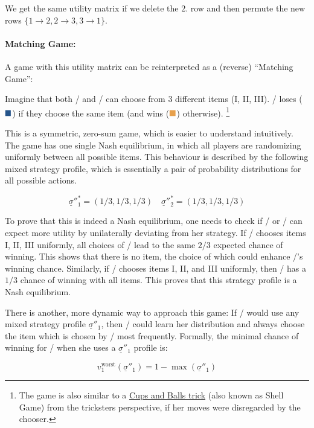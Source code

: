\documentclass{article}
\newcommand{\wbox}{\textcolor{w}{\blacksquare}}
\newcommand{\lbox}{\textcolor{l}{\blacksquare}}
\theoremstyle{definition}
\begin{document}
We get the same utility matrix if we delete the $2.$ row and then permute the new rows $\{1 \to 2, 2 \to 3, 3 \to 1 \}$.

\paragraph{Matching Game:}

A game with this utility matrix can be reinterpreted as a (reverse) ``Matching Game'':

Imagine that both \PI/ and \PII/ can choose from $3$ different items (I, II, III). \PI/ loses ($\lbox$) if they choose the same item (and wins ($\wbox$) otherwise). \footnote{The game is also similar to a \href{https://www.britannica.com/art/cups-and-balls-trick}{Cups and Balls trick} (also known as Shell Game) from the tricksters perspective, if her moves were disregarded by the chooser.}

This is a symmetric, zero-sum game, which is easier to understand intuitively.
The game has one single Nash equilibrium, in which all players are randomizing uniformly between all possible items. This behaviour is described by the following mixed strategy profile, which is essentially a pair of probability distributions for all possible actions.

\begin{equation}
    \underline{\sigma}''^*_1 =(1/3,1/3,1/3) \quad  \underline{\sigma}''^*_2 =(1/3,1/3,1/3)
\end{equation}

To prove that this is indeed a Nash equilibrium, one needs to check if \PI/ or \PII/ can expect more utility by unilaterally deviating from her strategy. If \PII/ chooses items I, II, III uniformly, all choices of \PI/ lead to the same $2/3$ expected chance of winning. This shows that there is no item, the choice of which could enhance \PI/'s winning chance. Similarly, if \PI/ chooses items I, II, and III uniformly, then \PII/ has a $1/3$ chance of winning with all items. This proves that this strategy profile is a Nash equilibrium.

There is another, more dynamic way to approach this game:
If \PI/ would use any mixed strategy profile $\underline{\sigma}''_1$, then \PII/ could learn her distribution and always choose the item which is chosen by \PI/ most frequently.
Formally, the minimal chance of winning for \PI/ when she uses a $\underline{\sigma}''_1$ profile is:

\begin{equation}
    v_1^{\mathrm{worst}}(\underline{\sigma}''_1) = 1- \max(\underline{\sigma}''_1)
\end{equation}
\end{document}
